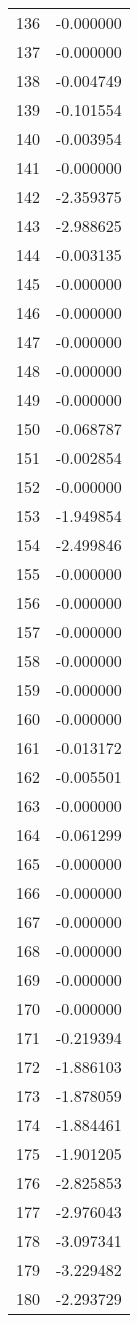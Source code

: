 \documentclass[12pt]{article}
\begin{document}
\begin{longtable}{@{}cc@{}}
136 & -0.000000 \\
137 & -0.000000 \\
138 & -0.004749 \\
139 & -0.101554 \\
140 & -0.003954 \\
141 & -0.000000 \\
142 & -2.359375 \\
143 & -2.988625 \\
144 & -0.003135 \\
145 & -0.000000 \\
146 & -0.000000 \\
147 & -0.000000 \\
148 & -0.000000 \\
149 & -0.000000 \\
150 & -0.068787 \\
151 & -0.002854 \\
152 & -0.000000 \\
153 & -1.949854 \\
154 & -2.499846 \\
155 & -0.000000 \\
156 & -0.000000 \\
157 & -0.000000 \\
158 & -0.000000 \\
159 & -0.000000 \\
160 & -0.000000 \\
161 & -0.013172 \\
162 & -0.005501 \\
163 & -0.000000 \\
164 & -0.061299 \\
165 & -0.000000 \\
166 & -0.000000 \\
167 & -0.000000 \\
168 & -0.000000 \\
169 & -0.000000 \\
170 & -0.000000 \\
171 & -0.219394 \\
172 & -1.886103 \\
173 & -1.878059 \\
174 & -1.884461 \\
175 & -1.901205 \\
176 & -2.825853 \\
177 & -2.976043 \\
178 & -3.097341 \\
179 & -3.229482 \\
180 & -2.293729 \\

\end{longtable}
\end{document}
